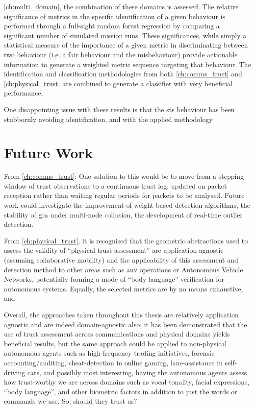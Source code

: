 \autoref{ch:multi_domain}, the combination of these domains is assessed.
The relative significance of metrics in the specific identification of a given behaviour is performed through a full-sight random forest regression by comparing a significant number of simulated mission runs.
These significances, while simply a statistical measure of the importance of a given metric in discriminating between two behaviour (i.e. a fair behaviour and the misbehaviour) provide actionable information to generate a weighted metric sequence targeting that behaviour.
The identification and classification methodologies from both \autoref{ch:comms_trust} and \autoref{ch:physical_trust} are combined to generate a classifier with very beneficial performance, 

One disappointing issue with these results is that the \gls{sts} behaviour has been stubbornly avoiding identification, and with the applied methodology 

\section{Future Work}
From \autoref{ch:comms_trust}:
One solution to this would be to move from a stepping-window of trust observations to a continuous trust log, updated on packet reception rather than waiting regular periods for packets to be analysed.
Future work could investigate the improvement of weight-based detection algorithms, the stability of \gls{gra} under multi-node collusion, the development of real-time outlier detection.

From \autoref{ch:physical_trust}, it is recognised that the geometric abstractions used to assess the validity of ``physical trust assessment'' are application-agnostic (assuming collaborative mobility) and the applicability of this assessment and detection method to other areas such as \gls{auv} operations or Autonomous Vehicle Networks, potentially forming a mode of ``body language'' verification for autonomous systems. 
Equally, the selected metrics are by no means exhaustive, and 

Overall, the approaches taken throughout this thesis are relatively application agnostic and are indeed domain-agnostic also; it has been demonstrated that the use of trust assessment across communications and physical domains yields beneficial results, but the same approach could be applied to non-physical autonomous agents such as high-frequency trading initiatives, forensic accounting/auditing,  cheat-detection in online gaming, lane-assistance in self-driving cars, and possibly most interesting, having the autonomous agents assess how trust-worthy we are across domains such as vocal tonality, facial expressions, ``body language'', and other biometric factors in addition to just the words or commands we use.
So, should they trust us?